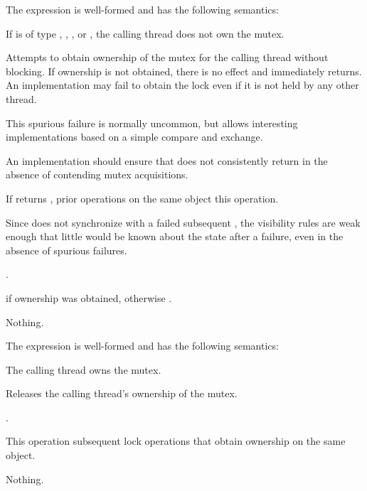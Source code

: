 \pnum
The expression  is well-formed and has the following semantics:
\begin{itemdescr}
\pnum
\expects
If  is of type , ,
, or , the calling
thread does not own the mutex.

\pnum
\effects
Attempts to obtain ownership of the mutex for the calling thread without
blocking. If ownership is not obtained, there is no effect and 
immediately returns. An implementation may fail to obtain the lock even if it is not
held by any other thread.
\begin{note}
This spurious failure is normally uncommon, but
allows interesting implementations based on a simple
compare and exchange.
\end{note}
An implementation should ensure that  does not consistently return 
in the absence of contending mutex acquisitions.

\pnum
\sync
If  returns , prior  operations
on the same object  this operation.
\begin{note}
Since  does not synchronize with a failed subsequent
, the visibility rules are weak enough that little would be
known about the state after a failure, even in the absence of spurious failures.
\end{note}

\pnum
\returntype {}.

\pnum
\returns
{} if ownership was obtained, otherwise .

\pnum
\throws
Nothing.
\end{itemdescr}

\pnum
The expression  is well-formed and has the following semantics:
\begin{itemdescr}
\pnum
\expects
The calling thread owns the mutex.

\pnum
\effects
Releases the calling thread's ownership of the mutex.

\pnum
\returntype {}.

\pnum
\sync
This operation  subsequent
lock operations that obtain ownership on the same object.

\pnum
\throws
Nothing.
\end{itemdescr}


